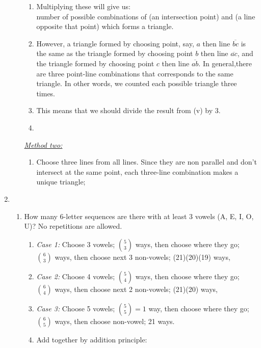 \documentclass[12pt]{amsart}
\begin{document}
\begin{enumerate}
\begin{enumerate}
\begin{enumerate}
        \item Multiplying these will give us:\\
        number of possible combinations of (an intersection point) and (a line opposite that point) which forms a triangle.
        \item However, a triangle formed by choosing point, say, $a$ then line $\overline{bc}$ is the same as the triangle formed by choosing point $b$ then line $\overline{ac}$, and the triangle formed by choosing point $c$ then line $\overline{ab}$. In general,there are three point-line combinations that corresponds to the same triangle. In other words, we counted each possible triangle three times.
        \item This means that we should divide the result from (v) by 3.
        \item {}
        
    \end{enumerate}
    \emph{\underline{Method two:}}
    \begin{enumerate}
        \item Choose three lines from all lines. Since they are non parallel and don't intersect at the same point, each three-line combination makes a unique triangle;\\ 
    \end{enumerate}
\end{enumerate}

\item \begin{enumerate}
    \item How many 6-letter sequences are there with at least 3 vowels (A, E, I, O, U)?
No repetitions are allowed.
    \begin{enumerate}
        \item \emph{Case 1:} Choose 3 vowels; $\binom53$ ways, then choose where they go; $\binom63$ ways, then choose next 3 non-vowels; (21)(20)(19) ways,
        \item \emph{Case 2:} Choose 4 vowels; $\binom54$ ways, then choose where they go; $\binom64$ ways, then choose next 2 non-vowels; (21)(20) ways,
        \item \emph{Case 3:} Choose 5 vowels; $\binom55 = 1$ way, then choose where they go; $\binom65$ ways, then choose non-vowel; 21 ways.
        \item Add together by addition principle: \\ 
        
    \end{enumerate}
\end{enumerate}



\end{enumerate}
\end{document}
